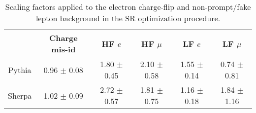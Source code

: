 \begin{table}[!htb]
\caption{Scaling factors applied to the electron charge-flip and non-prompt/fake lepton background in the SR optimization procedure.}
\label{tab:mctemplateF}
\def\arraystretch{1.1}
\centering
\begin{tabular}{|c||c|c|c|c|c|}
\hline 
& Charge mis-id & HF $e$ & HF $\mu$ & LF $e$ & LF $\mu$ \\ \hline\hline
Pythia & 0.96 $\pm$ 0.08 & 1.80 $\pm$ 0.45 & 2.10 $\pm$ 0.58 & 1.55 $\pm$ 0.14 & 0.74 $\pm$ 0.81\\\hline
Sherpa & 1.02 $\pm$ 0.09 & 2.72 $\pm$ 0.57 & 1.81 $\pm$ 0.75 & 1.16 $\pm$ 0.18 & 1.84 $\pm$ 1.16\\
\hline
\end{tabular}
\end{table}


